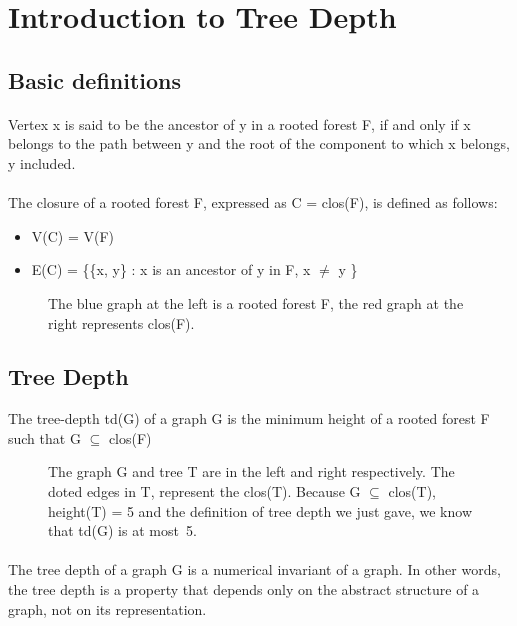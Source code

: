 \section{Introduction to Tree Depth}

\subsection{Basic definitions}

\paragraph{}
Vertex x is said to be the ancestor of y in a rooted forest F, if and only if x belongs to the path between y and the root of the component to which x belongs, y included.
\paragraph{}
The closure of a rooted forest F, expressed as C = clos(F), is defined as follows:
\begin{itemize}
  \item V(C) = V(F)
  \item E(C) = \{\{x, y\} : x is an ancestor of y in F, x $\neq$ y \}
\end{itemize}
\begin{figure}[h]

\caption{The blue graph at the left is a rooted forest F, the red graph at the right represents clos(F).}
\end{figure}

\subsection{Tree Depth}

\begin{definition}
The tree-depth td(G) of a graph G is the minimum height of a rooted forest F such that G $\subseteq$ clos(F)
\end{definition}

\begin{figure}[H]

\caption{The graph G and tree T are in the left and right respectively. The doted edges in T, represent the clos(T). Because G $\subseteq$ clos(T), height(T) = 5 and the definition of tree depth we just gave, we know that td(G) is at most~5.\label{fig:3d-cube}}
\end{figure}
\paragraph{}
The tree depth of a graph G is a numerical invariant of a graph. In other words, the tree depth is a property that depends only  on the abstract structure of a graph, not on its representation.	

